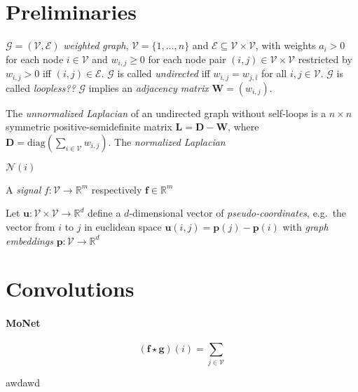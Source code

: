 \documentclass[pdftex,10pt,a4paper]{scrartcl}
\begin{document}
\section{Preliminaries}

$\mathcal{G} = (\mathcal{V}, \mathcal{E})$ \emph{weighted graph}, $\mathcal{V} = \{1, \ldots, n\}$ and $\mathcal{E} \subseteq \mathcal{V} \times \mathcal{V}$, with weights $a_i > 0$ for each node $i \in \mathcal{V}$ and $w_{i,j} \geq 0$ for each node pair $(i, j) \in \mathcal{V} \times \mathcal{V}$ restricted by $w_{i,j} > 0$ iff $(i, j) \in \mathcal{E}$.
$\mathcal{G}$ is called \emph{undirected} iff $w_{i,j} = w_{j,i}$ for all $i,j \in \mathcal{V}$.
$\mathcal{G}$ is called \emph{loopless??}
$\mathcal{G}$ implies an \emph{adjacency matrix} $\mathbf{W} = \left( w_{i,j} \right)$.

The \emph{unnormalized Laplacian} of an undirected graph without self-loops is a $n \times n$ symmetric positive-semidefinite matrix $\mathbf{L} = \mathbf{D} - \mathbf{W}$, where $\mathbf{D} = \mathrm{diag}\left( \sum_{i \in \mathcal{V}} w_{i,j}\right)$.
The \emph{normalized Laplacian}

$\mathcal{N}(i)$

A \emph{signal} $f \colon \mathcal{V} \to \mathbb{R}^m$ respectively $\mathbf{f} \in \mathbb{R}^m$

Let $\mathbf{u} \colon \mathcal{V} \times \mathcal{V} \to \mathbb{R}^d$ define a $d$-dimensional vector of \emph{pseudo-coordinates}, e.g.\ the vector from $i$ to $j$ in euclidean space $\mathbf{u}(i,j) = \mathbf{p}(j) - \mathbf{p}(i)$ with \emph{graph embeddings} $\mathbf{p} \colon \mathcal{V} \to \mathbb{R}^d$

\section{Convolutions}

\paragraph{MoNet}

\begin{equation*}
  (\mathbf{f} \star \mathbf{g})(i) = \sum_{j \in \mathcal{V}}
\end{equation*}



awdawd
\end{document}
